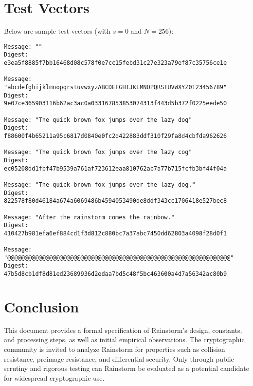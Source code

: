 \documentclass[11pt,a4paper]{article}
\begin{document}
\section*{Test Vectors}
Below are sample test vectors (with $s=0$ and $N=256$):

\begin{verbatim}
Message: ""
Digest: e3ea5f8885f7bb16468d08c578f0e7cc15febd31c27e323a79ef87c35756ce1e

Message: "abcdefghijklmnopqrstuvwxyzABCDEFGHIJKLMNOPQRSTUVWXYZ0123456789"
Digest: 9e07ce365903116b62ac3ac0a033167853853074313f443d5b372f0225eede50

Message: "The quick brown fox jumps over the lazy dog"
Digest: f88600f4b65211a95c6817d0840e0fc2d422883ddf310f29fa8d4cbfda962626

Message: "The quick brown fox jumps over the lazy cog"
Digest: ec05208dd1fbf47b9539a761af723612eaa810762ab7a77b715fcfb3bf44f04a

Message: "The quick brown fox jumps over the lazy dog."
Digest: 822578f80d46184a674a6069486b4594053490de8ddf343cc1706418e527bec8

Message: "After the rainstorm comes the rainbow."
Digest: 410427b981efa6ef884cd1f3d812c880bc7a37abc7450dd62803a4098f28d0f1

Message: "@@@@@@@@@@@@@@@@@@@@@@@@@@@@@@@@@@@@@@@@@@@@@@@@@@@@@@@@@@@@@@@@"
Digest: 47b5d8cb1df8d81ed23689936d2edaa7bd5c48f5bc463600a4d7a56342ac80b9
\end{verbatim}

\section*{Conclusion}
This document provides a formal specification of Rainstorm’s design, constants, and processing steps, as well as initial empirical observations. The cryptographic community is invited to analyze Rainstorm for properties such as collision resistance, preimage resistance, and differential security. Only through public scrutiny and rigorous testing can Rainstorm be evaluated as a potential candidate for widespread cryptographic use.
\end{document}
